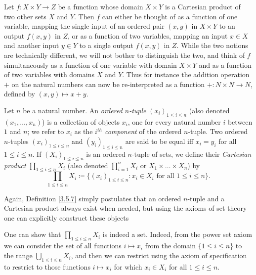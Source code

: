 \begin{note}
Let \(f : X \times Y \to Z\) be a function whose domain \(X \times Y\) is a Cartesian product of two other sets \(X\) and \(Y\).
Then \(f\) can either be thought of as a function of one variable, mapping the single input of an ordered pair \((x, y)\) in \(X \times Y\) to an output \(f(x, y)\) in \(Z\), or as a function of two variables, mapping an input \(x \in X\) and another input \(y \in Y\) to a single output \(f(x, y)\) in \(Z\).
While the two notions are technically different, we will not bother to distinguish the two, and think of \(f\) simultaneously as a function of one variable with domain \(X \times Y\) and as a function of two variables with domains \(X\) and \(Y\).
Thus for instance the addition operation \(+\) on the natural numbers can now be re-interpreted as a function \(+ : N \times N \to N\), defined by \((x, y) \mapsto x + y\).
\end{note}

\setcounter{theorem}{6}
\begin{definition}\label{3.5.7}
Let \(n\) be a natural number.
An \emph{ordered \(n\)-tuple} \((x_i)_{1 \leq i \leq n}\) (also denoted \((x_1, \dots, x_n)\)) is a collection of objects \(x_i\), one for every natural number \(i\) between \(1\) and \(n\);
we refer to \(x_i\) as the \emph{\(i^{th}\) component} of the ordered \(n\)-tuple.
Two ordered \(n\)-tuples \((x_i)_{1 \leq i \leq n}\) and \((y_i)_{1 \leq i \leq n}\) are said to be equal iff \(x_i = y_i\) for all \(1 \leq i \leq n\).
If \((X_i)_{1 \leq i \leq n}\) is an ordered \(n\)-tuple of sets, we define their \emph{Cartesian product} \(\prod_{1 \leq i \leq n} X_i\) (also denoted \(\prod_{i=1}^n X_i\) or \(X_1 \times \dots \times X_n\)) by
\[
    \prod_{1 \leq i \leq n} X_i \coloneqq \{(x_i)_{1 \leq i \leq n} : x_i \in X_i \text{ for all } 1 \leq i \leq n\}.
\]
\end{definition}

\begin{note}
Again, Definition \ref{3.5.7} simply postulates that an ordered \(n\)-tuple and a Cartesian product always exist when needed, but using the axioms of set theory one can explicitly construct these objects
\end{note}

\begin{remark}\label{3.5.8}
One can show that \(\prod_{1 \leq i \leq n} X_i\) is indeed a set.
Indeed, from the power set axiom we can consider the set of all functions \(i \mapsto x_i\) from the domain \(\{1 \leq i \leq n\}\) to the range \(\bigcup_{1 \leq i \leq n} X_i\), and then we can restrict using the axiom of specification to restrict to those functions \(i \mapsto x_i\) for which \(x_i \in X_i\) for all \(1 \leq i \leq n\).
\end{remark}

